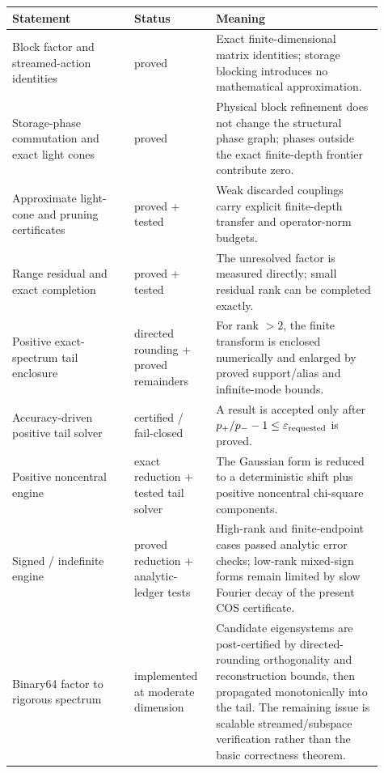 \documentclass[11pt]{article}
\theoremstyle{definition}
\theoremstyle{remark}
\begin{document}
\begin{center}
\small
\begin{tabular}{@{}p{0.30\linewidth}p{0.20\linewidth}p{0.41\linewidth}@{}}
\toprule
Statement & Status & Meaning\\
\midrule
Block factor and streamed-action identities &
proved &
Exact finite-dimensional matrix identities; storage blocking introduces no
mathematical approximation.\\

Storage-phase commutation and exact light cones &
proved &
Physical block refinement does not change the structural phase graph; phases
outside the exact finite-depth frontier contribute zero.\\

Approximate light-cone and pruning certificates &
proved + tested &
Weak discarded couplings carry explicit finite-depth transfer and
operator-norm budgets.\\

Range residual and exact completion &
proved + tested &
The unresolved factor is measured directly; small residual rank can be
completed exactly.\\

Positive exact-spectrum tail enclosure &
directed rounding + proved remainders &
For rank \(>2\), the finite transform is enclosed numerically and enlarged by
proved support/alias and infinite-mode bounds.\\

Accuracy-driven positive tail solver &
certified / fail-closed &
A result is accepted only after
\(p_+/p_- - 1\le\varepsilon_{\rm requested}\) is proved.\\

Positive noncentral engine &
exact reduction + tested tail solver &
The Gaussian form is reduced to a deterministic shift plus positive
noncentral chi-square components.\\

Signed / indefinite engine &
proved reduction + analytic-ledger tests &
High-rank and finite-endpoint cases passed analytic error checks; low-rank mixed-sign forms
remain limited by slow Fourier decay of the present COS certificate.\\

Binary64 factor to rigorous spectrum &
implemented at moderate dimension &
Candidate eigensystems are post-certified by directed-rounding orthogonality
and reconstruction bounds, then propagated monotonically into the tail.  The
remaining issue is scalable streamed/subspace verification rather than the
basic correctness theorem.\\
\bottomrule
\end{tabular}
\end{center}
\end{document}
